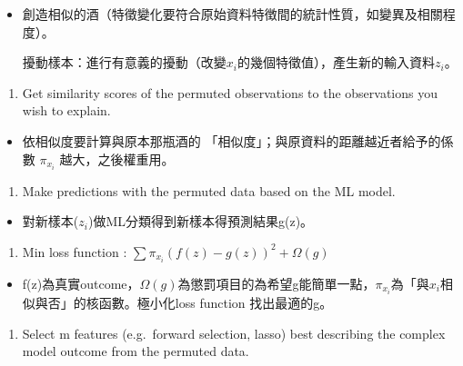 \documentclass[]{book}
\providecommand{\tightlist}{%
  \setlength{\itemsep}{0pt}\setlength{\parskip}{0pt}}
\begin{document}
\begin{itemize}
\item
  創造相似的酒（特徵變化要符合原始資料特徴間的統計性質，如變異及相關程度）。

  擾動樣本：進行有意義的擾動（改變\({x}_i\)的幾個特徵值），產生新的輸入資料\({z}_i\)。
\end{itemize}

\begin{enumerate}
\def\labelenumi{\arabic{enumi}.}
\setcounter{enumi}{1}
\tightlist
\item
  Get similarity scores of the permuted observations to the observations you wish to explain.
\end{enumerate}

\begin{itemize}
\tightlist
\item
  依相似度要計算與原本那瓶酒的 「相似度」；與原資料的距離越近者給予的係數 \(\pi_{{x}_i}\) 越大，之後權重用。
\end{itemize}

\begin{enumerate}
\def\labelenumi{\arabic{enumi}.}
\setcounter{enumi}{2}
\tightlist
\item
  Make predictions with the permuted data based on the ML model.
\end{enumerate}

\begin{itemize}
\tightlist
\item
  對新樣本(\({z}_i\))做ML分類得到新樣本得預測結果g(z)。
\end{itemize}

\begin{enumerate}
\def\labelenumi{\arabic{enumi}.}
\setcounter{enumi}{3}
\tightlist
\item
  Min loss function : \(\sum\pi_{{x}_i}(f(z)-g(z))^2+ \Omega(g)\)
\end{enumerate}

\begin{itemize}
\tightlist
\item
  f(z)為真實outcome，\(\Omega(g)\)為懲罰項目的為希望g能簡單一點，\(\pi_{{x}_i}\)為「與\({x}_i\)相似與否」的核函數。極小化loss function 找出最適的g。
\end{itemize}

\begin{enumerate}
\def\labelenumi{\arabic{enumi}.}
\setcounter{enumi}{3}
\tightlist
\item
  Select m features (e.g.~forward selection, lasso) best describing the complex model outcome from the permuted data.
\end{enumerate}
\end{document}
